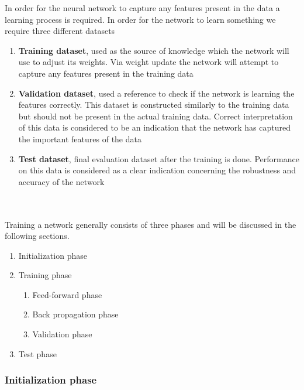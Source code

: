 \documentclass[]{article}
\begin{document}
In order for the neural network to capture any features present in the data a learning process is required. In order for the network to learn something we require three different datasets
\begin{enumerate}
	\item \textbf{Training dataset}, used as the source of knowledge which the network will use to adjust its weights. Via weight update the network will attempt to capture any features present in the training data
	\item \textbf{Validation dataset}, used a reference to check if the network is learning the features correctly. This dataset is constructed similarly to the training data but should not be present in the actual training data. Correct interpretation of this data is considered to be an indication that the network has captured the important features of the data 
	\item \textbf{Test dataset}, final evaluation dataset after the training is done. Performance on this data is considered as a clear indication concerning the robustness and accuracy of the network
\end{enumerate}
\\
\\
Training a network generally consists of three phases and will be discussed in the following sections.
\begin{enumerate}
	\item Initialization phase
	\item Training phase
		\begin{enumerate}
			\item Feed-forward phase
			\item Back propagation phase
			\item Validation phase
		\end{enumerate}
	\item Test phase
\end{enumerate}

\subsubsection{Initialization phase}
\end{document}
